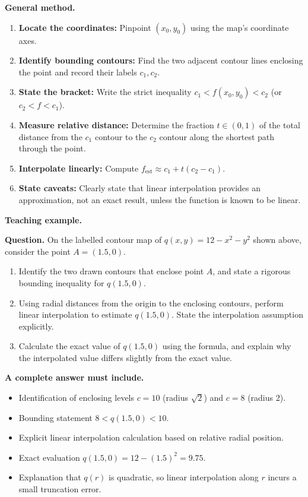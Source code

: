 \documentclass[11pt,letterpaper]{article}
\begin{document}
\textbf{General method.}
\begin{enumerate}[leftmargin=*,nosep]
    \item \textbf{Locate the coordinates:} Pinpoint $(x_0,y_0)$ using the map's coordinate axes.
    \item \textbf{Identify bounding contours:} Find the two adjacent contour lines enclosing the point and record their labels $c_1, c_2$.
    \item \textbf{State the bracket:} Write the strict inequality $c_1 < f(x_0,y_0) < c_2$ (or $c_2 < f < c_1$).
    \item \textbf{Measure relative distance:} Determine the fraction $t \in (0,1)$ of the total distance from the $c_1$ contour to the $c_2$ contour along the shortest path through the point.
    \item \textbf{Interpolate linearly:} Compute $f_{\text{est}} \approx c_1 + t(c_2 - c_1)$.
    \item \textbf{State caveats:} Clearly state that linear interpolation provides an approximation, not an exact result, unless the function is known to be linear.
\end{enumerate}

\textbf{Teaching example.}

\textbf{Question.} 
On the labelled contour map of $q(x,y) = 12 - x^2 - y^2$ shown above, consider the point $A = (1.5, 0)$.
\begin{enumerate}[label=(\alph*),nosep]
    \item Identify the two drawn contours that enclose point $A$, and state a rigorous bounding inequality for $q(1.5,0)$.
    \item Using radial distances from the origin to the enclosing contours, perform linear interpolation to estimate $q(1.5,0)$. State the interpolation assumption explicitly.
    \item Calculate the exact value of $q(1.5,0)$ using the formula, and explain why the interpolated value differs slightly from the exact value.
\end{enumerate}

\textbf{A complete answer must include.}
\begin{itemize}[leftmargin=*,nosep]
    \item Identification of enclosing levels $c=10$ (radius $\sqrt{2}$) and $c=8$ (radius $2$).
    \item Bounding statement $8 < q(1.5,0) < 10$.
    \item Explicit linear interpolation calculation based on relative radial position.
    \item Exact evaluation $q(1.5,0) = 12 - (1.5)^2 = 9.75$.
    \item Explanation that $q(r)$ is quadratic, so linear interpolation along $r$ incurs a small truncation error.
\end{itemize}
\end{document}
